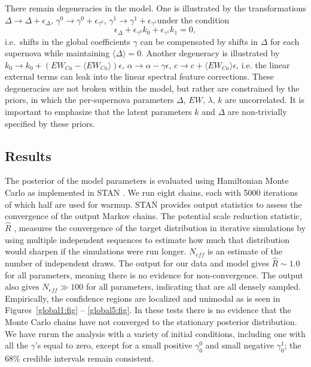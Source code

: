 \documentclass{aastex61}   	%
\begin{document}
There remain degeneracies in the model.  One is illustrated by the  transformations $\Delta \rightarrow \Delta  + \epsilon_\Delta$,
 $\gamma^0 \rightarrow \gamma^0  + \epsilon_{\gamma^0}$, $\gamma^1 \rightarrow \gamma^1 + \epsilon_{\gamma^1}$under the condition
$$
\epsilon_\Delta  +  \epsilon_{\gamma^0} k_0+  \epsilon_{\gamma^1} k_1=0,
$$
i.e.\ shifts in the global coefficients $\gamma$ can be compensated by shifts in $\Delta$ for each supernova while maintaining 
$\langle \Delta \rangle=0$.
Another degeneracy is illustrated by $k_0 \rightarrow k_0 + (EW_{Ca}-\langle EW_{Ca}\rangle)\epsilon$,
$\alpha \rightarrow \alpha - \gamma \epsilon$, $c \rightarrow c + \langle EW_{Ca}\rangle \epsilon$, i.e. the
linear external terms can leak into the linear spectral feature corrections.
These degeneracies are not broken within the model, but rather are constrained by the priors, in which the
per-supernova parameters
$\Delta$, $EW$, $\lambda$, $k$ are uncorrelated.  It is important to emphasize that the latent parameters $k$ and $\Delta$
are non-trivially specified by these priors.

\subsection{Results}
\label{results:sec}
The posterior of the model parameters is evaluated using Hamiltonian Monte Carlo as implemented in
STAN \citep{stan}.  We run eight chains, each with 5000 iterations of which
half are used for warmup.
STAN provides output statistics to assess
the convergence of the output Markov chains.
The 
potential scale reduction statistic, $\hat{R}$ \citep{Gelman92}, measures the convergence of the target distribution
in iterative simulations 
by using multiple independent sequences to estimate how much that distribution would sharpen if the simulations were run longer.
$N_{eff}$ is an estimate of the number of independent draws. The output for our data and model gives $\hat{R} \sim 1.0$ for all parameters, meaning there is no evidence for non-convergence.  The
output also gives  $N_{eff} \gg 100$ for all parameters, indicating that are all densely sampled.
Empirically, the confidence regions are localized and unimodal as is seen in  Figures~\ref{global1:fig} -- \ref{global5:fig}.  In these tests there is no evidence that
the Monte Carlo chains have not converged to the stationary posterior distribution.
We have rurun the analysis with a variety of initial conditions, including one with all the $\gamma$'s equal to zero, except for a small positive 
$\gamma^0_0$ and small negative $\gamma^1_0$; the 68\% credible intervals
remain consistent.
\end{document}
